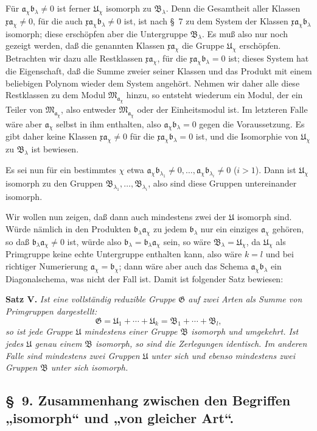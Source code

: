 \documentclass[11pt]{article}
\newcommand{\mM}{\mathfrak{M}}
\newcommand{\mG}{\mathfrak{G}}
\newcommand{\mB}{\mathfrak{B}}
\newcommand{\ma}{\mathfrak{a}}
\newcommand{\mb}{\mathfrak{b}}
\newcommand{\mx}{\mathfrak{x}}
\newcommand{\mU}{\mathfrak{U}}
\begin{document}
Für $\ma_\chi\mb_\lambda\ne0$ ist ferner $\mU_\chi$ isomorph zu $\mB_\lambda$. Denn die Gesamtheit aller Klassen $\mx\ma_\chi\ne0$, für die auch $\mx\ma_\chi\mb_\lambda\ne0$ ist, ist nach \S~7 zu dem System der Klassen $\mx\ma_\chi\mb_\lambda$ isomorph; diese erschöpfen aber die Untergruppe $\mB_\lambda$. Es muß also nur noch gezeigt werden, daß die genannten Klassen $\mx\ma_\chi$ die Gruppe $\mU_\chi$ erschöpfen. Betrachten wir dazu alle Restklassen $\mx\ma_\chi$, für die $\mx\ma_\chi\mb_\lambda=0$ ist; dieses System hat die Eigenschaft, daß die Summe zweier seiner Klassen und das Produkt mit einem beliebigen Polynom wieder dem System angehört. Nehmen wir daher alle diese Restklassen zu dem Modul $\mM_{\ma_\chi}$ hinzu, so entsteht wiederum ein Modul, der ein Teiler von $\mM_{\ma_\chi}$, also entweder $\mM_{\ma_\chi}$ oder der Einheitsmodul ist. Im letzteren Falle wäre aber $\ma_\chi$ selbst in ihm enthalten, also $\ma_\chi\mb_\lambda=0$ gegen die Voraussetzung. Es gibt daher keine Klassen $\mx\ma_\chi\ne0$ für die $\mx\ma_\chi\mb_\lambda=0$ ist, und die Isomorphie von $\mU_\chi$ zu $\mB_\lambda$ ist bewiesen.

Es sei nun für ein bestimmtes $\chi$ etwa $\ma_\chi\mb_{\lambda_1}\ne0,
\ldots,\ma_\chi\mb_{\lambda_i}\ne0$ ($i>1$). Dann ist $\mU_\chi$ isomorph zu den Gruppen $\mB_{\lambda_1},\ldots,\mB_{\lambda_i}$, also sind diese Gruppen untereinander isomorph.

Wir wollen nun zeigen, daß dann auch mindestens zwei der $\mU$ isomorph sind. Würde nämlich in den Produkten $\mb_\lambda\ma_\chi$ zu jedem $\mb_\lambda$ nur ein einziges $\ma_\chi$ gehören, so daß $\mb_\lambda\ma_\chi\ne0$ ist, würde also $\mb_\lambda=\mb_\lambda\ma_\chi$ sein, so wäre $\mB_\lambda=\mU_\chi$, da $\mU_\chi$ als Primgruppe keine echte Untergruppe enthalten kann, also wäre $k=l$ und bei richtiger Numerierung $\ma_\chi=\mb_\chi$; dann wäre aber auch das Schema $\ma_\chi\mb_\lambda$ ein Diagonalschema, was nicht der Fall ist. Damit ist folgender Satz bewiesen:

\textbf{Satz V.} \emph{Ist eine vollständig reduzible Gruppe $\mG$ auf zwei Arten als Summe von Primgruppen dargestellt:
\[
 \mG=\mU_1+\cdots+\mU_k=\mB_1+\cdots+\mB_l,
\]
so ist jede Gruppe $\mU$ mindestens einer Gruppe $\mB$ isomorph und umgekehrt. Ist jedes $\mU$ genau einem $\mB$ isomorph, so sind die Zerlegungen identisch. Im anderen Falle sind mindestens zwei Gruppen $\mU$ unter sich und ebenso mindestens zwei Gruppen $\mB$ unter sich isomorph.}

\subsection*{\S~9. Zusammenhang zwischen den Begriffen „isomorph“ und „von gleicher Art“.}
\end{document}
